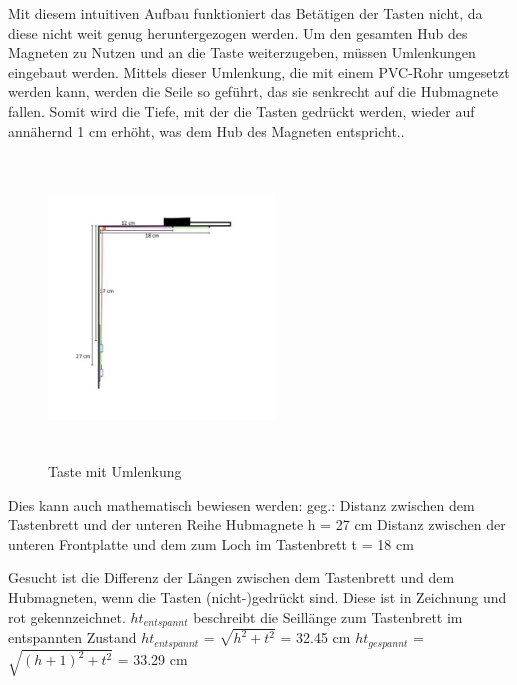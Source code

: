 Mit diesem intuitiven Aufbau funktioniert das Betätigen der Tasten nicht, da diese nicht weit genug heruntergezogen werden.
Um den gesamten Hub des Magneten zu Nutzen und an die Taste weiterzugeben, müssen Umlenkungen eingebaut werden.
Mittels dieser Umlenkung, die mit einem PVC-Rohr umgesetzt werden kann, werden die Seile so geführt, das sie senkrecht auf die Hubmagnete fallen.
Somit wird die Tiefe, mit der die Tasten gedrückt werden, wieder auf annähernd 1 cm erhöht, was dem Hub des Magneten entspricht..

\begin{figure}[htbp]
    \centering
    \includegraphics[width=6cm, height=8cm]{img/mitUmlenkung_locker}
    \caption{Taste mit Umlenkung}
    \label{img:mitumlenkung_locker}
\end{figure}


\newpage
Dies kann auch mathematisch bewiesen werden:
\newline geg.:
\newline Distanz zwischen dem Tastenbrett und der unteren Reihe Hubmagnete h = 27 cm
\newline Distanz zwischen der unteren Frontplatte und dem zum Loch im Tastenbrett t = 18 cm

Gesucht ist die Differenz der Längen zwischen dem Tastenbrett und dem Hubmagneten, wenn die Tasten (nicht-)gedrückt sind.
Diese ist in Zeichnung  und  rot gekennzeichnet.
\newline $ht_{entspannt}$ beschreibt die Seillänge zum Tastenbrett im entspannten Zustand
\newline $ht_{entspannt}$ = $\sqrt {h^{2} + t^{2}}$ = 32.45 cm
\newline $ht_{gespannt}$ = $\sqrt {(h + 1)^{2} + t^{2}}$ = 33.29 cm


